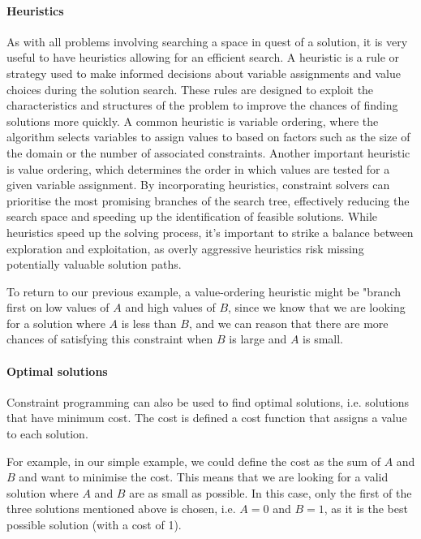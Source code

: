 \paragraph{Heuristics}
As with all problems involving searching a space in quest of a solution, it is very useful to have heuristics allowing for an efficient search. A heuristic is a rule or strategy used to make informed decisions about variable assignments and value choices during the solution search. These rules are designed to exploit the characteristics and structures of the problem to improve the chances of finding solutions more quickly. A common heuristic is variable ordering, where the algorithm selects variables to assign values to based on factors such as the size of the domain or the number of associated constraints. Another important heuristic is value ordering, which determines the order in which values are tested for a given variable assignment. By incorporating heuristics, constraint solvers can prioritise the most promising branches of the search tree, effectively reducing the search space and speeding up the identification of feasible solutions. While heuristics speed up the solving process, it's important to strike a balance between exploration and exploitation, as overly aggressive heuristics risk missing potentially valuable solution paths.


To return to our previous example, a value-ordering heuristic might be "branch first on low values of $A$ and high values of $B$, since we know that we are looking for a solution where $A$ is less than $B$, and we can reason that there are more chances of satisfying this constraint when $B$ is large and $A$ is small.

\paragraph{Optimal solutions}
Constraint programming can also be used to find optimal solutions, i.e. solutions that have minimum cost. The cost is defined a cost function that assigns a value to each solution.

For example, in our simple example, we could define the cost as the sum of $A$ and $B$ and want to minimise the cost. This means that we are looking for a valid solution where $A$ and $B$ are as small as possible. In this case, only the first of the three solutions mentioned above is chosen, i.e. $A=0$ and $B=1$, as it is the best possible solution (with a cost of 1).

